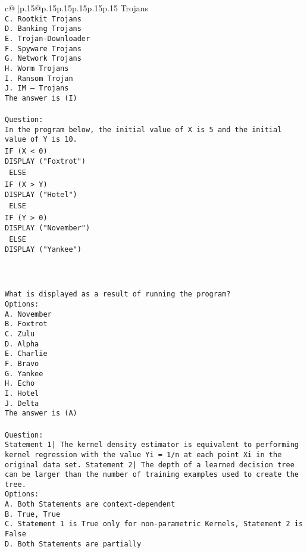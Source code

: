 \documentclass{article}
\begin{document}
{\begin{supertabular}{c@{$\;$}|p{.15\linewidth}@{}p{.15\linewidth}p{.15\linewidth}p{.15\linewidth}p{.15\linewidth}p{.15\linewidth}}
{{{Trojans\\ \tt C. Rootkit Trojans\\ \tt D. Banking Trojans\\ \tt E. Trojan-Downloader\\ \tt F. Spyware Trojans\\ \tt G. Network Trojans\\ \tt H. Worm Trojans\\ \tt I. Ransom Trojan\\ \tt J. IM – Trojans\\ \tt The answer is (I)\\ \tt \\ \tt Question:\\ \tt In the program below, the initial value of X is 5 and the initial value of Y is 10.\\ \tt IF (X < 0){\\ \tt  DISPLAY ("Foxtrot")\\ \tt } ELSE {\\ \tt  IF (X > Y){\\ \tt   DISPLAY ("Hotel")\\ \tt  } ELSE {\\ \tt   IF (Y > 0){\\ \tt    DISPLAY ("November")\\ \tt   } ELSE {\\ \tt    DISPLAY ("Yankee")\\ \tt   }\\ \tt  }\\ \tt }\\ \tt What is displayed as a result of running the program?\\ \tt Options:\\ \tt A. November\\ \tt B. Foxtrot\\ \tt C. Zulu\\ \tt D. Alpha\\ \tt E. Charlie\\ \tt F. Bravo\\ \tt G. Yankee\\ \tt H. Echo\\ \tt I. Hotel\\ \tt J. Delta\\ \tt The answer is (A)\\ \tt \\ \tt Question:\\ \tt Statement 1| The kernel density estimator is equivalent to performing kernel regression with the value Yi = 1/n at each point Xi in the original data set. Statement 2| The depth of a learned decision tree can be larger than the number of training examples used to create the tree.\\ \tt Options:\\ \tt A. Both Statements are context-dependent\\ \tt B. True, True\\ \tt C. Statement 1 is True only for non-parametric Kernels, Statement 2 is False\\ \tt D. Both Statements are partially }}}
\end{supertabular}}
\end{document}

